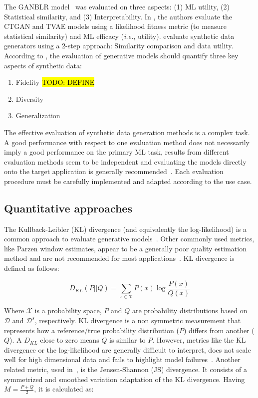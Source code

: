 \documentclass[parskip=full]{scrartcl}
\begin{document}
The GANBLR model~\cite{zhang2021ganblr} was evaluated on three aspects: (1) ML
utility, (2) Statistical similarity, and (3) Interpretability. In
\citet{xu2019modeling}, the authors evaluate the CTGAN and TVAE models using a
likelihood fitness metric (to measure statistical similarity) and ML efficacy
(\textit{i.e.}, utility). \citet{hittmeir2019utility} evaluate synthetic data
generators using a 2-step approach: Similarity comparison and data utility.
According to \citet{alaa2022faithful}, the evaluation of generative models
should quantify three key aspects of synthetic data:

\begin{enumerate}
    \item Fidelity \hl{TODO: DEFINE}
    \item Diversity 
    \item Generalization
\end{enumerate}

The effective evaluation of synthetic data generation methods is a complex
task. A good performance with respect to one evaluation method does not
necessarily imply a good performance on the primary ML task, results from
different evaluation methods seem to be independent and evaluating the models
directly onto the target application is generally
recommended~\cite{theis2016note}. Each evaluation procedure must be carefully
implemented and adapted according to the use case.

\subsection{Quantitative approaches}

The Kullback-Leibler (KL) divergence (and equivalently the log-likelihood) is a
common approach to evaluate generative models~\cite{theis2016note}. Other
commonly used metrics, like Parzen window estimates, appear to be a generally
poor quality estimation method and are not recommended for most
applications~\citet{theis2016note}. KL divergence is defined as follows:

\begin{equation}
    D_{KL}(P||Q) = \sum_{x\in\mathcal{X}}P(x)\log{\frac{P(x)}{Q(x)}}
\end{equation}

Where $\mathcal{X}$ is a probability space, $P$ and $Q$ are probability
distributions based on $\mathcal{D}$ and $\mathcal{D}^s$, respectively. KL
divergence is a non symmetric measurement that represents how a reference/true
probability distribution ($P$) differs from another ($Q$). A $D_{KL}$ close to
zero means $Q$ is similar to $P$.  However, metrics like the KL divergence or
the log-likelihood are generally difficult to interpret, does not scale well
for high dimensional data and fails to highlight model
failures~\cite{alaa2022faithful}. Another related metric, used
in~\cite{zhao2021ctab}, is the Jensen-Shannon (JS) divergence. It consists of
a symmetrized and smoothed variation adaptation of the KL divergence. Having
$M=\frac{P+Q}{2}$, it is calculated as:
\end{document}
